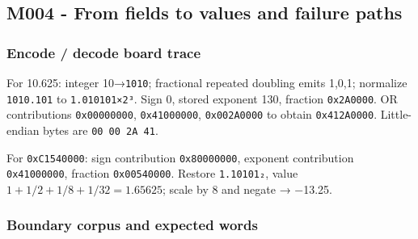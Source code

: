 \subsection{M004 - From fields to values and failure paths}\label{appendix-92ff77d4dfdc-m004---from-fields-to-values-and-failure-paths}

\hypertarget{appendix-92ff77d4dfdc-m004---from-fields-to-values-and-failure-paths}{}

\subsubsection{Encode / decode board trace}\label{appendix-92ff77d4dfdc-encode-decode-board-trace}

\hypertarget{appendix-92ff77d4dfdc-encode-decode-board-trace}{}

For 10.625: integer 10→\texttt{1010}; fractional repeated doubling emits 1,0,1; normalize \texttt{1010.101} to \texttt{1.010101×2³}. Sign 0, stored exponent 130, fraction \texttt{0x2A0000}. OR contributions \texttt{0x00000000}, \texttt{0x41000000}, \texttt{0x002A0000} to obtain \texttt{0x412A0000}. Little-endian bytes are \texttt{00\ 00\ 2A\ 41}.

For \texttt{0xC1540000}: sign contribution \texttt{0x80000000}, exponent contribution \texttt{0x41000000}, fraction \texttt{0x00540000}. Restore \texttt{1.10101₂}, value \(1+1/2+1/8+1/32=1.65625\); scale by 8 and negate → −13.25.

\subsubsection{Boundary corpus and expected words}\label{appendix-92ff77d4dfdc-boundary-corpus-and-expected-words}

\hypertarget{appendix-92ff77d4dfdc-boundary-corpus-and-expected-words}{}

